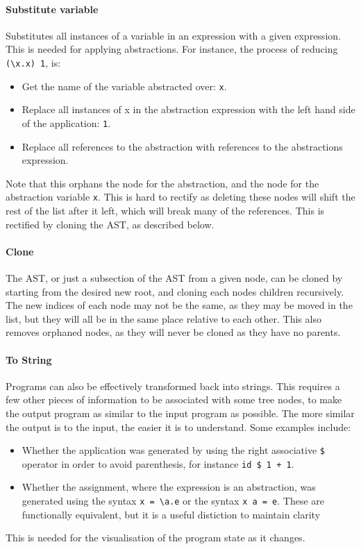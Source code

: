 \documentclass[
author=Kiran Sturt,
degree=BSc,
title=Implementing a Step by Step Evaluator for a Simple Functional Programming language,
unit=COMS30045,twoside]{dissertation}
\theoremstyle{definition}
\theoremstyle{break}
\theoremstyle{definition}
\begin{document}
\paragraph{Substitute variable} Substitutes all instances of a variable in an expression with a given expression. This is needed for applying abstractions. For instance, the process of reducing \verb|(\x.x) 1|, is:
\begin{itemize}
    \item Get the name of the variable abstracted over: \verb|x|.
    \item Replace all instances of x in the abstraction expression with the left hand side of the application: \verb|1|.
    \item Replace all references to the abstraction with references to the abstractions expression. 
\end{itemize}
Note that this orphans the node for the abstraction, and the node for the abstraction variable \verb|x|. This is hard to rectify as deleting these nodes will shift the rest of the list after it left, which will break many of the references. This is rectified by cloning the AST, as described below.

\paragraph{Clone} The AST, or just a subsection of the AST from a given node, can be cloned by starting from the desired new root, and cloning each nodes children recursively. The new indices of each node may not be the same, as they may be moved in the list, but they will all be in the same place relative to each other. This also removes orphaned nodes, as they will never be cloned as they have no parents. 

\paragraph{To String} \label{paragraph:to_string} Programs can also be effectively transformed back into strings. This requires a few other pieces of information to be associated with some tree nodes, to make the output program as similar to the input program as possible. The more similar the output is to the input, the easier it is to understand. Some examples include:
\begin{itemize}
    \item Whether the application was generated by using the right associative \verb|$| operator in order to avoid parenthesis, for instance \verb|id $ 1 + 1|.
    \item Whether the assignment, where the expression is an abstraction, was generated using the syntax \verb|x = \a.e| or the syntax \verb|x a = e|. These are functionally equivalent, but it is a useful distiction to maintain clarity
\end{itemize}
This is needed for the visualisation of the program state as it changes. 
\end{document}
